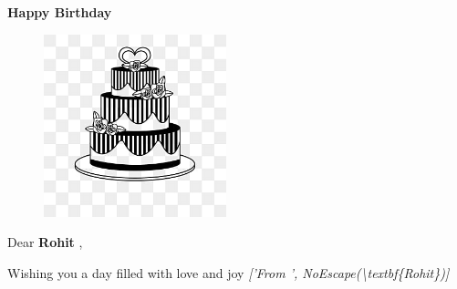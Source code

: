 \documentclass{article}%
\begin{document}
%
\normalsize%
\begin{center}%
\begin{Large}%
\textbf{Happy Birthday}%
\end{Large}%
\linebreak%


\begin{figure}[h!]%
\centering%
\includegraphics[width=200px]{cake.jpg}%
\end{figure}

%
\linebreak%
\begin{Large}%
Dear %
\textbf{Rohit}%
,%
\end{Large}%
\linebreak%
Wishing you a day filled with love and joy%
\linebreak%
\linebreak%
\textit{{[}'From ', NoEscape(\textbackslash{}textbf\{Rohit\}){]}}%
\linebreak%
\end{center}%
\end{document}
